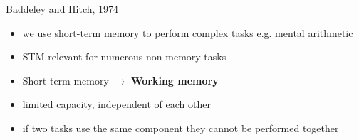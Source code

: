 \documentclass[]{beamer}
\begin{document}
\begin{frame}
\begin{overlayarea}{110mm}{80mm}

Baddeley and Hitch, 1974
\begin{itemize}
 \item we use short-term memory to perform complex tasks e.g. mental arithmetic  
 \item STM relevant for numerous non-memory tasks
 \item<2->[$\Rightarrow$]  Short-term memory $\rightarrow$ \textbf{Working memory}
\end{itemize}
\vspace{3mm}
\begin{itemize}
 \item<4->[!] limited capacity, independent of each other
 \item<4->[$\rightarrow$] if two tasks use the same component they cannot be performed together
\end{itemize}

\end{overlayarea}
\end{frame}
\end{document}
